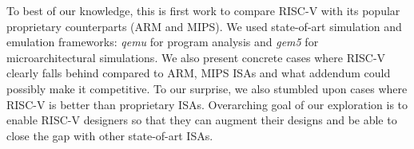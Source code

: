 
To best of our knowledge, this is first work to compare RISC-V with its popular proprietary counterparts (ARM and MIPS). We used state-of-art simulation and emulation frameworks: \textit{qemu} for program analysis and \textit{gem5} for microarchitectural simulations. We also present concrete cases where RISC-V clearly falls behind compared to ARM, MIPS ISAs and what addendum could possibly make it competitive. To our surprise, we also stumbled upon cases where RISC-V is better than proprietary ISAs. Overarching goal of our exploration is to enable RISC-V designers so that they can augment their designs and be able to close the gap with other state-of-art ISAs.
